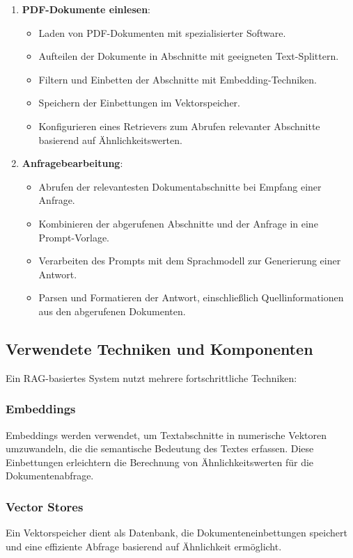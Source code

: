 \begin{enumerate}
    \item \textbf{PDF-Dokumente einlesen}:
    \begin{itemize}
        \item Laden von PDF-Dokumenten mit spezialisierter Software.
        \item Aufteilen der Dokumente in Abschnitte mit geeigneten Text-Splittern.
        \item Filtern und Einbetten der Abschnitte mit Embedding-Techniken.
        \item Speichern der Einbettungen im Vektorspeicher.
        \item Konfigurieren eines Retrievers zum Abrufen relevanter Abschnitte basierend auf Ähnlichkeitswerten.
    \end{itemize}
    \item \textbf{Anfragebearbeitung}:
    \begin{itemize}
        \item Abrufen der relevantesten Dokumentabschnitte bei Empfang einer Anfrage.
        \item Kombinieren der abgerufenen Abschnitte und der Anfrage in eine Prompt-Vorlage.
        \item Verarbeiten des Prompts mit dem Sprachmodell zur Generierung einer Antwort.
        \item Parsen und Formatieren der Antwort, einschließlich Quellinformationen aus den abgerufenen Dokumenten.
    \end{itemize}
\end{enumerate}
 

\subsection{Verwendete Techniken und Komponenten}
Ein RAG-basiertes System nutzt mehrere fortschrittliche Techniken:

\subsubsection{Embeddings}
Embeddings werden verwendet, um Textabschnitte in numerische Vektoren umzuwandeln, die die semantische Bedeutung des Textes erfassen. Diese Einbettungen erleichtern die Berechnung von Ähnlichkeitswerten für die Dokumentenabfrage.

\subsubsection{Vector Stores}
Ein Vektorspeicher dient als Datenbank, die Dokumenteneinbettungen speichert und eine effiziente Abfrage basierend auf Ähnlichkeit ermöglicht.

